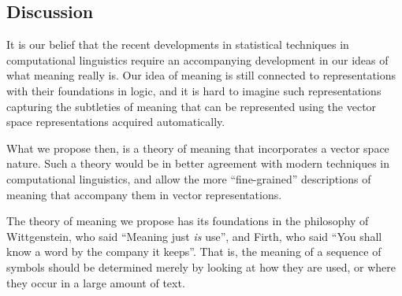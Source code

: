 
\subsection{Discussion}

It is our belief that the recent developments in statistical techniques in computational linguistics require an accompanying development in our ideas of what meaning really is. Our idea of meaning is still connected to representations with their foundations in logic, and it is hard to imagine such representations capturing the subtleties of meaning that can be represented using the vector space representations acquired automatically.

What we propose then, is a theory of meaning that incorporates a vector space nature. Such a theory would be in better agreement with modern techniques in computational linguistics, and allow the more ``fine-grained'' descriptions of meaning that accompany them in vector representations.

The theory of meaning we propose has its foundations in the philosophy of Wittgenstein, who said ``Meaning just \emph{is} use'', and Firth, who said ``You shall know a word  by the company it keeps''. That is, the meaning of a sequence of symbols should be determined merely by looking at how they are used, or where they occur in a large amount of text.

